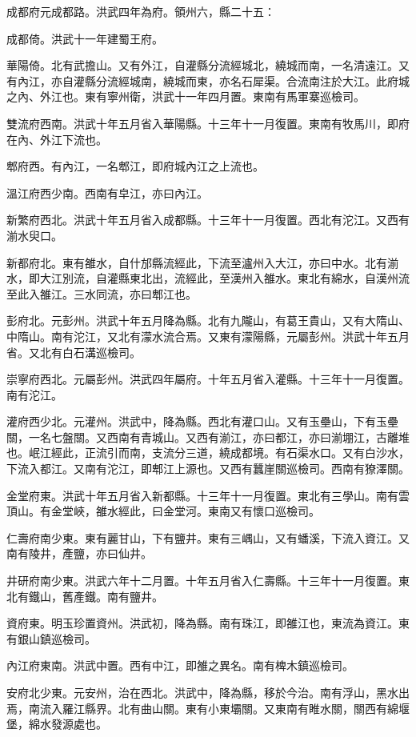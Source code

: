 成都府元成都路。洪武四年為府。領州六，縣二十五：

成都倚。洪武十一年建蜀王府。

華陽倚。北有武擔山。又有外江，自灌縣分流經城北，繞城而南，一名清遠江。又有內江，亦自灌縣分流經城南，繞城而東，亦名石犀渠。合流南注於大江。此府城之內、外江也。東有寧州衛，洪武十一年四月置。東南有馬軍寨巡檢司。

雙流府西南。洪武十年五月省入華陽縣。十三年十一月復置。東南有牧馬川，即府在內、外江下流也。

郫府西。有內江，一名郫江，即府城內江之上流也。

溫江府西少南。西南有皁江，亦曰內江。

新繁府西北。洪武十年五月省入成都縣。十三年十一月復置。西北有沱江。又西有湔水臾口。

新都府北。東有雒水，自什邡縣流經此，下流至瀘州入大江，亦曰中水。北有湔水，即大江別流，自灌縣東北出，流經此，至漢州入雒水。東北有綿水，自漢州流至此入雒江。三水同流，亦曰郫江也。

彭府北。元彭州。洪武十年五月降為縣。北有九隴山，有葛王貴山，又有大隋山、中隋山。南有沱江，又北有濛水流合焉。又東有濛陽縣，元屬彭州。洪武十年五月省。又北有白石溝巡檢司。

崇寧府西北。元屬彭州。洪武四年屬府。十年五月省入灌縣。十三年十一月復置。南有沱江。

灌府西少北。元灌州。洪武中，降為縣。西北有灌口山。又有玉壘山，下有玉壘關，一名七盤關。又西南有青城山。又西有湔江，亦曰都江，亦曰湔堋江，古離堆也。岷江經此，正流引而南，支流分三道，繞成都境。有石渠水口。又有白沙水，下流入都江。又南有沱江，即郫江上源也。又西有蠶崖關巡檢司。西南有獠澤關。

金堂府東。洪武十年五月省入新都縣。十三年十一月復置。東北有三學山。南有雲頂山。有金堂峽，雒水經此，曰金堂河。東南又有懷口巡檢司。

仁壽府南少東。東有麗甘山，下有鹽井。東有三嵎山，又有蟠溪，下流入資江。又南有陵井，產鹽，亦曰仙井。

井研府南少東。洪武六年十二月置。十年五月省入仁壽縣。十三年十一月復置。東北有鐵山，舊產鐵。南有鹽井。

資府東。明玉珍置資州。洪武初，降為縣。南有珠江，即雒江也，東流為資江。東有銀山鎮巡檢司。

內江府東南。洪武中置。西有中江，即雒之異名。南有椑木鎮巡檢司。

安府北少東。元安州，治在西北。洪武中，降為縣，移於今治。南有浮山，黑水出焉，南流入羅江縣界。北有曲山關。東有小東壩關。又東南有睢水關，關西有綿堰堡，綿水發源處也。

